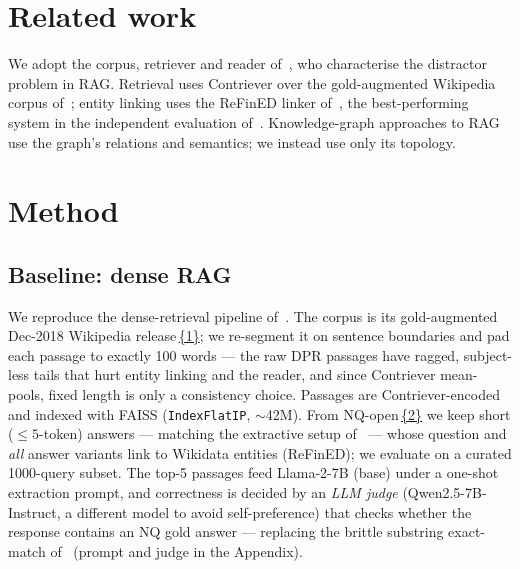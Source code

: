 \documentclass{article}
\begin{document}
\section{Related work}

We adopt the corpus, retriever and reader of~\citet{Cuconasu_2024}, who characterise the distractor problem in RAG. Retrieval uses Contriever over the gold-augmented Wikipedia corpus of~\citet{Cuconasu_2024}; entity linking uses the ReFinED linker of~\citet{ayoola2022refinedefficientzeroshotcapableapproach}, the best-performing system in the independent evaluation of~\citet{bast2023fairindepthevaluationexisting}. Knowledge-graph approaches to RAG use the graph's relations and semantics; we instead use only its topology.

\section{Method}

\subsection{Baseline: dense RAG}
We reproduce the dense-retrieval pipeline of~\citet{Cuconasu_2024}. The corpus is its gold-augmented Dec-2018 Wikipedia release\,\href{https://huggingface.co/datasets/florin-hf/wiki_dump2018_nq_open}{\{1\}}; we re-segment it on sentence boundaries and pad each passage to exactly 100 words --- the raw DPR passages have ragged, subject-less tails that hurt entity linking and the reader, and since Contriever mean-pools, fixed length is only a consistency choice. Passages are Contriever-encoded and indexed with FAISS (\texttt{IndexFlatIP}, $\sim$42M). From NQ-open\,\href{https://huggingface.co/datasets/florin-hf/nq_open_gold}{\{2\}} we keep short ($\le 5$-token) answers --- matching the extractive setup of~\citet{Cuconasu_2024} --- whose question and \emph{all} answer variants link to Wikidata entities (ReFinED); we evaluate on a curated 1000-query subset. The top-5 passages feed Llama-2-7B (base) under a one-shot extraction prompt, and correctness is decided by an \emph{LLM judge} (Qwen2.5-7B-Instruct, a different model to avoid self-preference) that checks whether the response contains an NQ gold answer --- replacing the brittle substring exact-match of~\citet{Cuconasu_2024} (prompt and judge in the Appendix).
\end{document}
